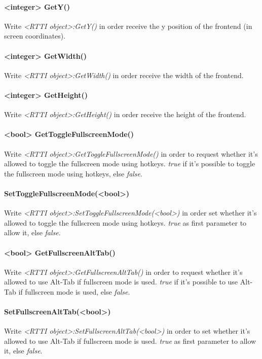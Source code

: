 \paragraph{<integer> GetY()}
Write \emph{<RTTI object>:GetY()} in order receive the y position of the frontend (in screen coordinates).

\paragraph{<integer> GetWidth()}
Write \emph{<RTTI object>:GetWidth()} in order receive the width of the frontend.

\paragraph{<integer> GetHeight()}
Write \emph{<RTTI object>:GetHeight()} in order receive the height of the frontend.

\paragraph{<bool> GetToggleFullscreenMode()}
Write \emph{<RTTI object>:GetToggleFullscreenMode()} in order to request whether it's allowed to toggle the fullscreen mode using hotkeys. \emph{true} if it's possible to toggle the fullscreen mode using hotkeys, else \emph{false}.

\paragraph{SetToggleFullscreenMode(<bool>)}
Write \emph{<RTTI object>:SetToggleFullscreenMode(<bool>)} in order set whether it's allowed to toggle the fullscreen mode using hotkeys. \emph{true} as first parameter to allow it, else \emph{false}.

\paragraph{<bool> GetFullscreenAltTab()}
Write \emph{<RTTI object>:GetFullscreenAltTab()} in order to request whether it's allowed to use Alt-Tab if fullscreen mode is used. \emph{true} if it's possible to use Alt-Tab if fullscreen mode is used, else \emph{false}.

\paragraph{SetFullscreenAltTab(<bool>)}
Write \emph{<RTTI object>:SetFullscreenAltTab(<bool>)} in order to set whether it's allowed to use Alt-Tab if fullscreen mode is used. \emph{true} as first parameter to allow it, else \emph{false}.

